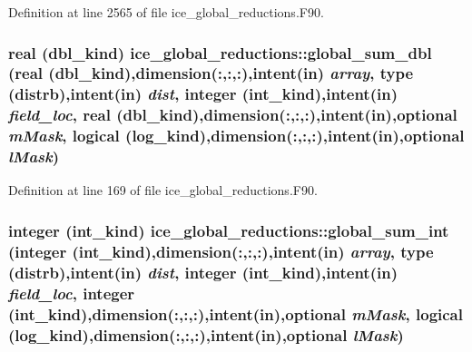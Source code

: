 Definition at line 2565 of file ice\_\-global\_\-reductions.F90.\hypertarget{namespaceice__global__reductions_a6b1dda84ce2a327ce579b34697eeb79f}{
\subsubsection[{global\_\-sum\_\-dbl}]{\setlength{\rightskip}{0pt plus 5cm}real (dbl\_\-kind) ice\_\-global\_\-reductions::global\_\-sum\_\-dbl (real (dbl\_\-kind),dimension(:,:,:),intent(in) {\em array}, \/  type (distrb),intent(in) {\em dist}, \/  integer (int\_\-kind),intent(in) {\em field\_\-loc}, \/  real (dbl\_\-kind),dimension(:,:,:),intent(in),optional {\em mMask}, \/  logical (log\_\-kind),dimension(:,:,:),intent(in),optional {\em lMask})}}
\label{namespaceice__global__reductions_a6b1dda84ce2a327ce579b34697eeb79f}


Definition at line 169 of file ice\_\-global\_\-reductions.F90.\hypertarget{namespaceice__global__reductions_a75c457045df8607362a57112dd907a6d}{
\subsubsection[{global\_\-sum\_\-int}]{\setlength{\rightskip}{0pt plus 5cm}integer (int\_\-kind) ice\_\-global\_\-reductions::global\_\-sum\_\-int (integer (int\_\-kind),dimension(:,:,:),intent(in) {\em array}, \/  type (distrb),intent(in) {\em dist}, \/  integer (int\_\-kind),intent(in) {\em field\_\-loc}, \/  integer (int\_\-kind),dimension(:,:,:),intent(in),optional {\em mMask}, \/  logical (log\_\-kind),dimension(:,:,:),intent(in),optional {\em lMask})}}
\label{namespaceice__global__reductions_a75c457045df8607362a57112dd907a6d}



